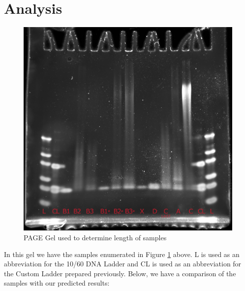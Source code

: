 \documentclass{ssiBio}
\begin{document}
\section{Analysis}
\begin{figure}[ht]
	\begin{center}
		\includegraphics[width=.5\textwidth]{./resources/gels/labeled.png}
		\caption{PAGE Gel used to determine length of samples}
		\label{mainGel}
	\end{center}
\end{figure}
In this gel we have the samples enumerated in Figure \ref{mainGel} above. L is used as an abbreviation for the 10/60 DNA Ladder and CL is used as an abbreviation for the Custom Ladder prepared previously. Below, we have a comparison of the samples with our predicted results:
\newcommand{\Y}{\textbf{\checkmark}}
\newcommand{\B}{\textbf{B}}
\newcommand{\N}{\textbf{$\times$}}
\end{document}
